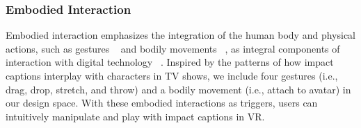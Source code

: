 

\subsubsection{Embodied Interaction}
Embodied interaction emphasizes the integration of the human body and physical actions, such as gestures ~\cite{luo2024emotion} and bodily movements ~\cite{mueller2018experiencing}, as integral components of interaction with digital technology ~\cite{smith2018communication, kirsh2013embodied}.
Inspired by the patterns of how impact captions interplay with characters in TV shows, we include four gestures (i.e., drag, drop, stretch, and throw) and a bodily movement (i.e., attach to avatar) in our design space.
With these embodied interactions as triggers, users can intuitively manipulate and play with impact captions in VR.


